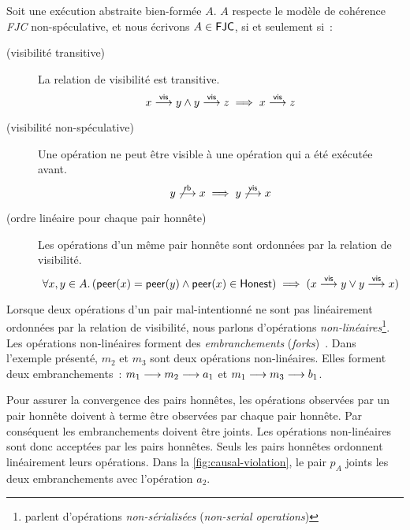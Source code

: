 \begin{definition}\label{def:fjc-consistency}
  Soit une exécution abstraite bien-formée $A$. $A$ respecte le modèle de cohérence \emph{\acf{FJC}} non-spéculative, et nous écrivons $A \in \operatorname{\mathsf{FJC}}$, si et seulement si~:

  \begin{description}
  \item[ (visibilité transitive)]
  La relation de visibilité est transitive.
  \begin{equation*}
    x \overset{\mathsf{vis}}{\longrightarrow} y \land y \overset{\mathsf{vis}}{\longrightarrow} z \implies x \overset{\mathsf{vis}}{\longrightarrow} z
  \end{equation*}

  \item[ (visibilité non-spéculative)]
  Une opération ne peut être visible à une opération qui a été exécutée avant.
  \begin{equation*}
    y \not\overset{\mathsf{rb}}{\longrightarrow} x \implies y \not\overset{\mathsf{vis}}{\longrightarrow} x
  \end{equation*}

  \item[ (ordre linéaire pour chaque pair honnête)]
  Les opérations d'un même pair honnête sont ordonnées par la relation de visibilité.
  \begin{equation*}
    \forall x, y \in A \ldotp (\operatorname{\mathsf{peer}}(x) = \operatorname{\mathsf{peer}}(y) \land \operatorname{\mathsf{peer}}(x) \in \operatorname{\mathsf{Honest}}) \implies (x \overset{\mathsf{vis}}{\longrightarrow} y \lor y \overset{\mathsf{vis}}{\longrightarrow} x)
  \end{equation*}
  \end{description}
\end{definition}

Lorsque deux opérations d'un pair mal-intentionné ne sont pas linéairement ordonnées par la relation de visibilité, nous parlons d'opérations \emph{non-linéaires}\footnote{\textcite{mahajan_2011_cac} parlent d'opérations \emph{non-sérialisées} (\emph{non-serial operations})}.
Les opérations non-linéaires forment des \emph{embranchements} (\emph{forks})~\autocite{li_2004_sundr}.
Dans l'exemple présenté, $m_2$ et $m_3$ sont deux opérations non-linéaires. Elles forment deux embranchements~: $m_1 \longrightarrow m_2 \longrightarrow a_1$ et $m_1 \longrightarrow m_3 \longrightarrow b_1$.

Pour assurer la convergence des pairs honnêtes, les opérations observées par un pair honnête doivent à terme être observées par chaque pair honnête.
Par conséquent les embranchements doivent être joints.
Les opérations non-linéaires sont donc acceptées par les pairs honnêtes.
Seuls les pairs honnêtes ordonnent linéairement leurs opérations.
Dans la \autoref{fig:causal-violation}, le pair $p_A$ joints les deux embranchements avec l'opération $a_2$.

